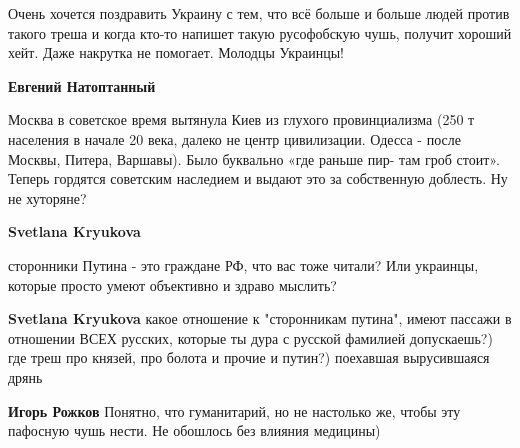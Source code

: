 \begin{itemize}
\begin{itemize}
 

Очень хочется поздравить Украину с тем, что всё больше и больше людей против
такого треша и когда кто-то напишет такую русофобскую чушь, получит хороший
хейт. Даже накрутка не помогает. Молодцы Украинцы!

 
\textbf{Евгений Натоптанный} 

Москва в советское время вытянула Киев из глухого провинциализма (250 т
населения в начале 20 века, далеко не центр цивилизации. Одесса - после Москвы,
Питера, Варшавы). Было буквально «где раньше пир- там гроб стоит». Теперь
гордятся советским наследием и выдают это за собственную доблесть. Ну не
хуторяне?


 
\textbf{Svetlana Kryukova} 

сторонники Путина - это граждане РФ, что вас тоже читали? Или украинцы, которые
просто умеют объективно и здраво мыслить?

 
\textbf{Svetlana Kryukova} какое отношение к "сторонникам путина", имеют пассажи в отношении ВСЕХ русских, которые ты дура с русской фамилией допускаешь?) где треш про князей, про болота и прочие и путин?) поехавшая вырусившаяся дрянь

 
\textbf{Игорь Рожков} Понятно, что гуманитарий, но не настолько же, чтобы эту пафосную чушь нести. Не обошлось без влияния медицины)


\end{itemize}
\end{itemize}

